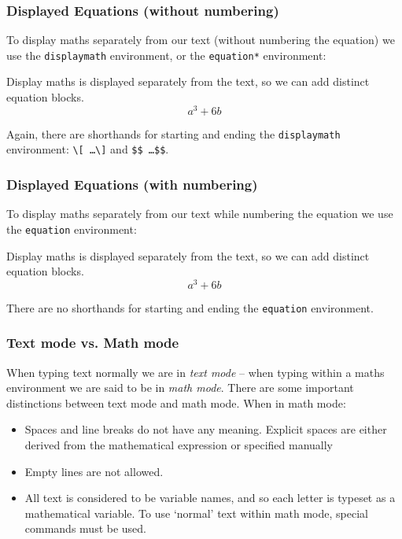 \documentclass[mathserif]{beamer}
\begin{document}
\begin{frame}[fragile]
\frametitle{Displayed Equations (without numbering)}
\vfill
To display maths separately from our text (without numbering the equation) we use the \texttt{displaymath} environment, or the \texttt{equation*} environment:
\vfill
	\begin{LTXexample}[style=latexsty]
		Display maths is displayed separately from the text, so we can add distinct equation blocks.
		\begin{displaymath}
		    a^3 + 6b
		\end{displaymath}
	\end{LTXexample}
\vfill
Again, there are shorthands for starting and ending the \texttt{displaymath} environment: \texttt{{\textbackslash}[ \ldots {\textbackslash}]} and \texttt{\$\$ \ldots \$\$}.
\vfill
\end{frame}

\begin{frame}[fragile]
\frametitle{Displayed Equations (with numbering)}
\vfill
To display maths separately from our text while numbering the equation we use the \texttt{equation} environment:
\vfill
	\begin{LTXexample}[style=latexsty]
		Display maths is displayed separately from the text, so we can add distinct equation blocks.
		\begin{equation}
		    a^3 + 6b
		\end{equation}
	\end{LTXexample}
\vfill
There are no shorthands for starting and ending the \texttt{equation} environment.
\vfill
\end{frame}

\begin{frame}
\frametitle{Text mode vs. Math mode}
\vfill
When typing text normally we are in \emph{text mode} -- when typing within a maths environment we are said to be in \emph{math mode}.
\vfill
There are some important distinctions between text mode and math mode. When in math mode:
\vfill
\begin{itemize}
	\item Spaces and line breaks do not have any meaning. Explicit spaces are either derived from the mathematical expression or specified manually
	\item Empty lines are not allowed.
	\item All text is considered to be variable names, and so each letter is typeset as a mathematical variable. To use `normal' text within math mode, special commands must be used.
\end{itemize}
\vfill
\end{frame}
\end{document}
